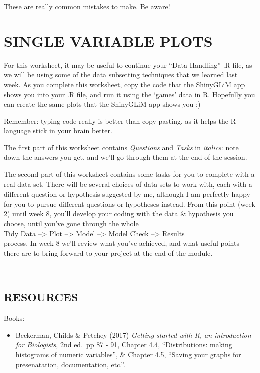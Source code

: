 \documentclass[
]{book}
\providecommand{\tightlist}{%
  \setlength{\itemsep}{0pt}\setlength{\parskip}{0pt}}
\begin{document}
These are really common mistakes to make. Be aware!

\hypertarget{single-variable-plots}{%
\chapter{SINGLE VARIABLE PLOTS}\label{single-variable-plots}}

For this worksheet, it may be useful to continue your ``Data Handling'' .R file,
as we will be using some of the data subsetting techniques that we learned
last week. As you complete this worksheet, copy the code that the ShinyGLiM
app shows you into your .R file, and run it using the `games' data in R. Hopefully
you can create the same plots that the ShinyGLiM app shows you :)

Remember: typing code really is better than copy-pasting, as it helps the R language stick in your
brain better.

The first part of this worksheet contains \emph{Questions} and \emph{Tasks} in \emph{italics}: note
down the answers you get, and we'll go through them at the end of the session.

The second part of this worksheet contains some tasks for you to complete with a
real data set. There will be several choices of data sets to work with, each with a different
question or hypothesis suggested by me, although I am perfectly happy for
you to pursue different questions or hypotheses instead.
From this point (week 2) until week 8, you'll develop
your coding with the data \& hypothesis you choose, until you've gone through the whole\\
Tidy Data --\textgreater{} Plot --\textgreater{} Model --\textgreater{} Model Check --\textgreater{} Results\\
process. In week 8 we'll review what you've achieved, and what useful points there
are to bring forward to your project at the end of the module.\\
~\\

\begin{center}\rule{0.5\linewidth}{0.5pt}\end{center}

\hypertarget{resources}{%
\section{RESOURCES}\label{resources}}

Books:

\begin{itemize}
\tightlist
\item
  Beckerman, Childs \& Petchey (2017) \emph{Getting started with R, an
  introduction for Biologists}, 2nd ed.~pp 87 - 91, Chapter 4.4, ``Distributions:
  making histograms of numeric variables'', \& Chapter 4.5, ``Saving your graphs for
  presenatation, documentation, etc.''.
  ~
\end{itemize}
\end{document}
